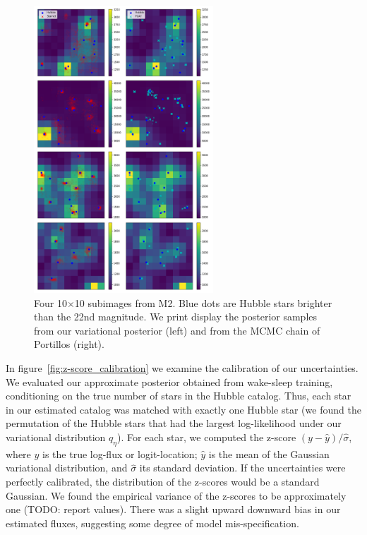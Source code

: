\begin{figure}[h]
    \centering
    \includegraphics[width=0.6\textwidth]{figures/example_subimages_samples.png}
    \caption{Four 10$\times$10 subimages from
    M2. Blue dots are Hubble stars brighter than the 22nd magnitude.
    We print display the posterior samples from our variational
    posterior (left) and from the MCMC chain of Portillos (right). }
    \label{fig:example_subimages_sampled}
\end{figure}

In figure~\ref{fig:z-score_calibration} we examine the calibration of our uncertainties. We evaluated our approximate posterior obtained from wake-sleep training, conditioning on the true number of stars in the Hubble catalog. Thus, each star in our estimated 
catalog was matched with exactly one Hubble star (we found the permutation of the Hubble stars that had the largest log-likelihood under our variational distribution $q_\eta$). For each star, we computed the z-score $(y - \hat y) / \hat \sigma$, where $y$ is the true log-flux or 
logit-location; $\hat y$ is the mean of the Gaussian variational distribution, and $\hat\sigma$  its standard deviation. If the uncertainties were perfectly calibrated, the distribution of the 
z-scores would be a standard Gaussian. We found the empirical variance of the z-scores
to be approximately one (TODO: report values). There was a slight upward downward bias in our estimated fluxes, suggesting some degree of model mis-specification. 

